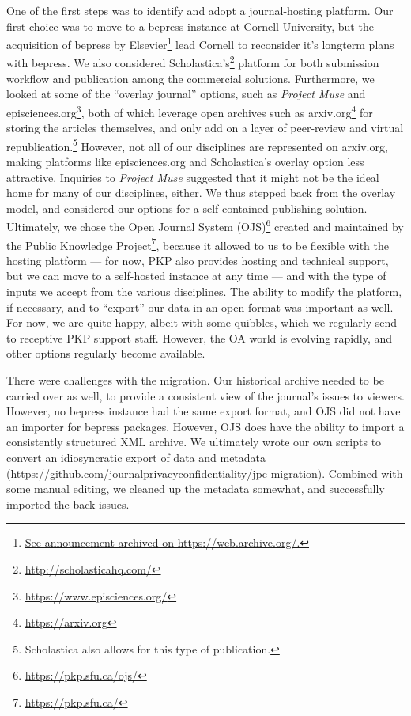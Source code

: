 \documentclass[final]{jpcfinal} %
\newcommand{\urlcite}[2]{#2\footnote{\url{#1}}}
\newcommand{\urlcitex}[3]{#2\footnote{\href{#1}{#3}}}
\begin{document}
One of the first steps was to identify and adopt a journal-hosting platform. Our first choice was to move to a bepress instance at Cornell University, but the \urlcitex{https://web.archive.org/web/20181220151809/https://www.elsevier.com/about/press-releases/corporate/elsevier-acquires-bepress,-a-leading-service-provider-used-by-academic-institutions-to-showcase-their-research}{acquisition of bepress by Elsevier}{See announcement archived on  https://web.archive.org/.} lead Cornell to reconsider it's longterm plans with bepress. We also considered  \urlcite{http://scholasticahq.com/}{Scholastica's}  platform for both submission workflow and publication among the commercial solutions. Furthermore, we looked at some of the ``overlay journal'' options, such as \textit{Project Muse} and \urlcite{https://www.episciences.org/}{episciences.org}, both of which leverage open archives such as \urlcite{https://arxiv.org}{arxiv.org} for storing the articles themselves, and only add on a layer of peer-review and virtual republication.\footnote{Scholastica also allows for this type of publication.} 
%
However, not all of our disciplines are represented on arxiv.org, making platforms like episciences.org and Scholastica's overlay option less attractive. Inquiries to \textit{Project Muse} suggested that it might not be the ideal home for many of our disciplines, either. We thus stepped back from the overlay model, and considered our options for a self-contained publishing solution. Ultimately, we chose the \urlcite{https://pkp.sfu.ca/ojs/}{Open Journal System (OJS)}  created and maintained by the \urlcite{https://pkp.sfu.ca/}{Public Knowledge Project}, because it allowed to us to be flexible with the hosting platform --- for now, PKP also provides hosting and technical support, but we can move to a self-hosted instance at any time --- and with the type of inputs we accept from the various disciplines. The ability to modify the platform, if necessary, and to ``export'' our data in an open format was important as well. For now, we are quite happy, albeit with some quibbles, which we regularly send to receptive PKP support staff. However, the OA world is evolving rapidly, and other options regularly become available.  

There were challenges with the migration. Our historical archive needed to be carried over as well, to provide a consistent view of the journal's issues to viewers. However, no bepress instance had the same export format, and OJS did not have an importer for bepress packages. However, OJS does have the ability to import a consistently structured XML archive. We ultimately wrote our own scripts to convert an idiosyncratic export of data and metadata (\url{https://github.com/journalprivacyconfidentiality/jpc-migration}). Combined with some manual editing, we cleaned up the metadata somewhat, and successfully imported the back issues.
\end{document}

